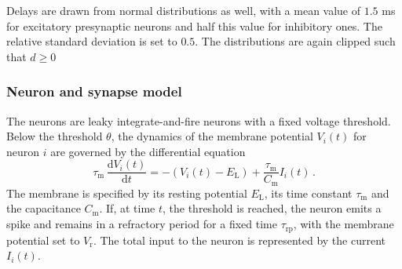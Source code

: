 Delays are drawn from normal distributions as well, with a mean value 
of $1.5$ ms for excitatory presynaptic neurons and half this value for 
inhibitory ones. The relative standard deviation is set to $0.5$. The distributions
are again clipped such that $d \ge 0$

\subsubsection{Neuron and synapse model}
The neurons are leaky integrate-and-fire neurons with a fixed voltage threshold. 
Below the threshold $\theta$, the dynamics of the membrane potential $V_i(t)$ 
for neuron $i$ are governed by the differential equation 
\begin{equation}
    \tau_\text{m} \,\frac{\text{d} V_i(t)}{\text{d} t} 
            = -(V_i(t) - E_\text{L}) + \frac{\tau_\text{m}}{C_\text{m}} I_i(t) \, .
    \label{eq:leaky_integrator}
\end{equation}
The membrane is specified by its resting potential $E_\text{L}$, 
its time constant $\tau_\text{m}$ and the capacitance $C_\text{m}$.
If, at time $t$, the threshold is reached, the neuron emits a spike and remains 
in a refractory period for a fixed time $\tau_\text{rp}$, with the membrane 
potential set to $V_\text{r}$. The total input to the neuron is represented by 
the current $I_i(t)$. 

